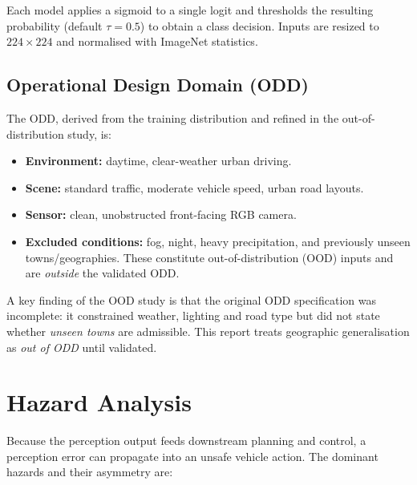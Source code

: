 \documentclass[11pt,a4paper]{article}
\begin{document}
Each model applies a sigmoid to a single logit and thresholds the resulting
probability (default $\tau = 0.5$) to obtain a class decision. Inputs are
resized to $224\times224$ and normalised with ImageNet statistics.

\subsection{Operational Design Domain (ODD)}
The ODD, derived from the training distribution and refined in the
out-of-distribution study, is:

\begin{itemize}[leftmargin=1.4em,itemsep=1pt]
  \item \textbf{Environment:} daytime, clear-weather urban driving.
  \item \textbf{Scene:} standard traffic, moderate vehicle speed, urban road layouts.
  \item \textbf{Sensor:} clean, unobstructed front-facing RGB camera.
  \item \textbf{Excluded conditions:} fog, night, heavy precipitation, and
        previously unseen towns/geographies. These constitute
        out-of-distribution (OOD) inputs and are \emph{outside} the validated ODD.
\end{itemize}

A key finding of the OOD study is that the original ODD specification was
incomplete: it constrained weather, lighting and road type but did not state
whether \emph{unseen towns} are admissible. This report treats geographic
generalisation as \emph{out of ODD} until validated.

\section{Hazard Analysis}
Because the perception output feeds downstream planning and control, a
perception error can propagate into an unsafe vehicle action. The dominant
hazards and their asymmetry are:
\end{document}

